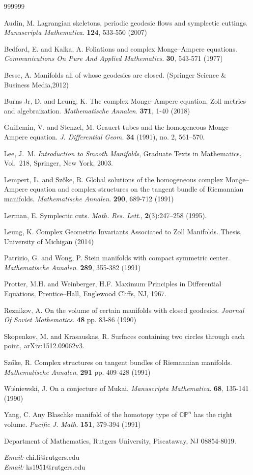 \documentclass[a4paper, 12pt]{article}
\newcommand{\bCP}{\mathbb{CP}^n}
\begin{document}
\begin{thebibliography}{999999}

Audin, M. Lagrangian skeletons, periodic geodesic flows and symplectic cuttings. {\em Manuscripta Mathematica}. \textbf{124}, 533-550 (2007)

Bedford, E. and Kalka, A. Foliations and complex Monge--Ampere equations. {\em Communications On Pure And Applied Mathematics}. \textbf{30}, 543-571 (1977)

Besse, A. Manifolds all of whose geodesics are closed. (Springer Science \& Business Media,2012)

Burns Jr, D. and Leung, K. The complex Monge--Ampere equation, Zoll metrics and algebraization. {\em Mathematische Annalen}. \textbf{371}, 1-40 (2018)

Guillemin, V. and Stenzel, M. Grauert tubes and the homogeneous Monge--Ampere equation. {\em J.
Differential Geom.} \textbf{34} (1991), no. 2, 561–570.

Lee, J.~M. \emph{Introduction to Smooth Manifolds}, Graduate Texts in Mathematics, Vol.~218, Springer, New York, 2003.


Lempert, L. and Szőke, R. Global solutions of the homogeneous complex Monge--Ampere equation and complex structures on the tangent bundle of Riemannian manifolds. {\em Mathematische Annalen}. \textbf{290}, 689-712 (1991)

Lerman, E. Symplectic cuts. {\em Math. Res. Lett.}, \textbf{2}(3):247–258 (1995). 


Leung, K. Complex Geometric Invariants Associated to Zoll Manifolds. Thesis, University of Michigan (2014)

Patrizio, G. and Wong, P. Stein manifolds with compact symmetric center. {\em Mathematische Annalen}. \textbf{289}, 355-382 (1991)

Protter, M.H. and Weinberger, H.F. Maximum Principles in Differential Equations, Prentice–Hall, Englewood Cliffs, NJ, 1967.


Reznikov, A. On the volume of certain manifolds with closed geodesics. {\em Journal Of Soviet Mathematics}. \textbf{48} pp. 83-86 (1990)


Skopenkov, M. and Krasauskas, R. Surfaces containing two circles through each point, arXiv:1512.09062v3. 

Szőke, R. Complex structures on tangent bundles of Riemannian manifolds. {\em Mathematische Annalen}. \textbf{291} pp. 409-428 (1991)

Wiśniewski, J. On a conjecture of Mukai. {\em Manuscripta Mathematica}. \textbf{68}, 135-141 (1990)

Yang, C. Any Blaschke manifold of the homotopy type of $\bCP$ has the right volume. {\em Pacific J. Math}. \textbf{151}, 379-394 (1991)

\end{thebibliography}

\vskip 3mm
\noindent
Department of Mathematics, Rutgers University, Piscataway, NJ 08854-8019.

\noindent
{\it Email:} chi.li@rutgers.edu\\
{\it Email:} ks1951@rutgers.edu
\end{document}
